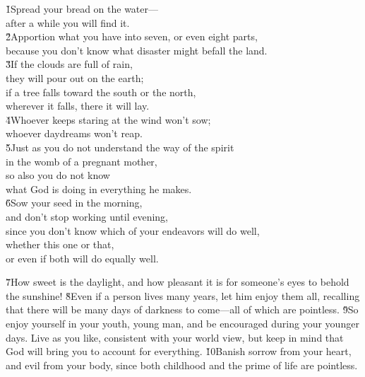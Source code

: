 \begin{poetry}
\poeml {}
\v{1}Spread your bread on the water--- \\
\poeml after a while you will find it. \\
\poeml \v{2}Apportion what you have into seven, or even eight parts, \\
\poemll    because you don't know what disaster might befall the land. \\
\poeml \v{3}If the clouds are full of rain, \\
\poemll    they will pour out on the earth; \\
\poeml if a tree falls toward the south or the north, \\
\poemll    wherever it falls, there it will lay. \\
\poeml \v{4}Whoever keeps staring at the wind won't sow; \\
\poemll    whoever daydreams won't reap. \\
\poeml \v{5}Just as you do not understand the way of the spirit \\
\poemll    in the womb of a pregnant mother, \\
\poeml so also you do not know \\
\poemll    what God is doing in everything he makes. \\
\poeml \v{6}Sow your seed in the morning, \\
\poemll    and don't stop working until evening, \\
\poeml since you don't know which of your endeavors will do well, \\
\poemll    whether this one or that, \\
\poemlll       or even if both will do equally well.
\end{poetry}

\v{7}How sweet is the daylight, and how pleasant it is for someone's eyes to behold the sunshine! \v{8}Even if a person lives many years, let him enjoy them all, recalling that there will be many days of darkness to come---all of which are pointless. \v{9}So enjoy yourself in your youth, young man, and be encouraged during your younger days. Live as you like, consistent with your world view, but keep in mind that God will bring you to account for everything. \v{10}Banish sorrow from your heart, and evil from your body, since both childhood and the prime of life are pointless.

